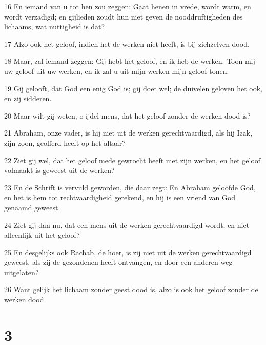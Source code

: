 \par 16 En iemand van u tot hen zou zeggen: Gaat henen in vrede, wordt warm, en wordt verzadigd; en gijlieden zoudt hun niet geven de nooddruftigheden des lichaams, wat nuttigheid is dat?
\par 17 Alzo ook het geloof, indien het de werken niet heeft, is bij zichzelven dood.
\par 18 Maar, zal iemand zeggen: Gij hebt het geloof, en ik heb de werken. Toon mij uw geloof uit uw werken, en ik zal u uit mijn werken mijn geloof tonen.
\par 19 Gij gelooft, dat God een enig God is; gij doet wel; de duivelen geloven het ook, en zij sidderen.
\par 20 Maar wilt gij weten, o ijdel mens, dat het geloof zonder de werken dood is?
\par 21 Abraham, onze vader, is hij niet uit de werken gerechtvaardigd, als hij Izak, zijn zoon, geofferd heeft op het altaar?
\par 22 Ziet gij wel, dat het geloof mede gewrocht heeft met zijn werken, en het geloof volmaakt is geweest uit de werken?
\par 23 En de Schrift is vervuld geworden, die daar zegt: En Abraham geloofde God, en het is hem tot rechtvaardigheid gerekend, en hij is een vriend van God genaamd geweest.
\par 24 Ziet gij dan nu, dat een mens uit de werken gerechtvaardigd wordt, en niet alleenlijk uit het geloof?
\par 25 En desgelijks ook Rachab, de hoer, is zij niet uit de werken gerechtvaardigd geweest, als zij de gezondenen heeft ontvangen, en door een anderen weg uitgelaten?
\par 26 Want gelijk het lichaam zonder geest dood is, alzo is ook het geloof zonder de werken dood.

\chapter{3}

